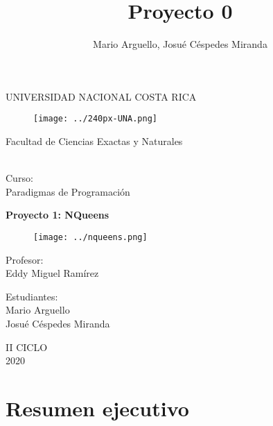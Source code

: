 \documentclass[10pt,a4paper]{article}
\author{Mario Arguello, Josué Céspedes Miranda}
\title{Proyecto 0}
\begin{document}
\begin{titlepage}
\begin{center}
\begin{large}
UNIVERSIDAD NACIONAL COSTA RICA \\
\begin{figure}[htp]
\centering
\texttt{[image: ../240px-UNA.png]} 
\label{foto}
\end{figure}
\end{large}
\vspace*{1cm}
\begin{large}
Facultad de Ciencias Exactas y Naturales
\end{large} 
\begin{large}
\vspace*{1cm}\\
Curso:\\
\vspace*{2mm}
Paradigmas de Programación\\
\end{large}
\vspace*{12mm}
\begin{large}
\textbf{Proyecto 1: 
NQueens
}\\
\end{large}
\begin{figure}[htp]
\centering
\texttt{[image: ../nqueens.png]} 
\label{foto}
\end{figure}
\begin{large}
\vspace*{1cm}
Profesor:\\
\vspace*{5mm}
Eddy Miguel Ramírez\\
\end{large}
\begin{large}
\vspace*{1cm}
Estudiantes: \\
\vspace*{5mm}
Mario Arguello \\
Josué Céspedes Miranda \\
\end{large}
\vspace*{1cm}
II CICLO\\
\vspace*{1cm}
2020
\end{center}
\end{titlepage}
\tableofcontents
\pagebreak
\section{Resumen ejecutivo}
\end{document}
